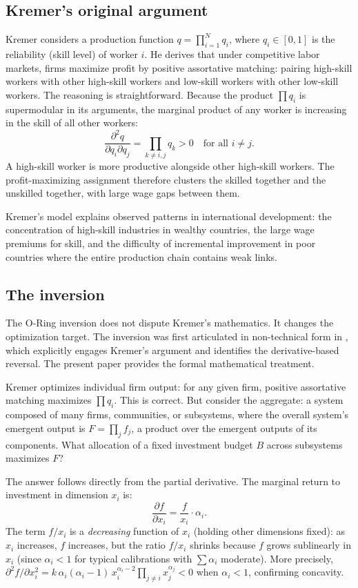 \documentclass[12pt, a4paper]{article}
\theoremstyle{definition}
\theoremstyle{remark}
\begin{document}
\subsection{Kremer's original argument}

Kremer \cite{kremer1993} considers a production function $q = \prod_{i=1}^{N} q_i$, where $q_i \in [0, 1]$ is the reliability (skill level) of worker $i$. He derives that under competitive labor markets, firms maximize profit by positive assortative matching: pairing high-skill workers with other high-skill workers and low-skill workers with other low-skill workers. The reasoning is straightforward. Because the product $\prod q_i$ is supermodular in its arguments, the marginal product of any worker is increasing in the skill of all other workers:
\[
\frac{\partial^2 q}{\partial q_i \partial q_j} = \prod_{k \neq i, j} q_k > 0 \quad \text{for all } i \neq j.
\]
A high-skill worker is more productive alongside other high-skill workers. The profit-maximizing assignment therefore clusters the skilled together and the unskilled together, with large wage gaps between them.

Kremer's model explains observed patterns in international development: the concentration of high-skill industries in wealthy countries, the large wage premiums for skill, and the difficulty of incremental improvement in poor countries where the entire production chain contains weak links.

\subsection{The inversion}

The O-Ring inversion does not dispute Kremer's mathematics. It changes the optimization target. The inversion was first articulated in non-technical form in \cite{kirsch2025}, which explicitly engages Kremer's argument and identifies the derivative-based reversal. The present paper provides the formal mathematical treatment.

Kremer optimizes individual firm output: for any given firm, positive assortative matching maximizes $\prod q_i$. This is correct. But consider the aggregate: a system composed of many firms, communities, or subsystems, where the overall system's emergent output is $F = \prod_j f_j$, a product over the emergent outputs of its components. What allocation of a fixed investment budget $B$ across subsystems maximizes $F$?

The answer follows directly from the partial derivative. The marginal return to investment in dimension $x_i$ is:
\begin{equation}\label{eq:marginal}
\frac{\partial f}{\partial x_i} = \frac{f}{x_i} \cdot \alpha_i.
\end{equation}
The term $f / x_i$ is a \textit{decreasing} function of $x_i$ (holding other dimensions fixed): as $x_i$ increases, $f$ increases, but the ratio $f / x_i$ shrinks because $f$ grows sublinearly in $x_i$ (since $\alpha_i < 1$ for typical calibrations with $\sum \alpha_i$ moderate). More precisely, $\partial^2 f / \partial x_i^2 = k \, \alpha_i(\alpha_i - 1) \, x_i^{\alpha_i - 2} \prod_{j \neq i} x_j^{\alpha_j} < 0$ when $\alpha_i < 1$, confirming concavity.
\end{document}
